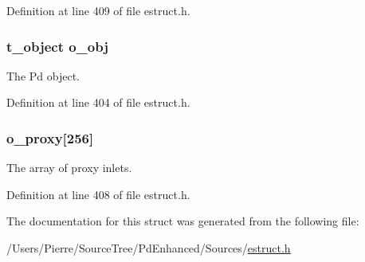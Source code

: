Definition at line 409 of file estruct.\-h.

\hypertarget{struct__eobj_a8cffa8f3338cca7779ab922dab19227c}{
\subsubsection[{o\-\_\-obj}]{\setlength{\rightskip}{0pt plus 5cm}t\-\_\-object o\-\_\-obj}}\label{struct__eobj_a8cffa8f3338cca7779ab922dab19227c}
The Pd object. 

Definition at line 404 of file estruct.\-h.

\hypertarget{struct__eobj_a9435dcf0a1aed105a4c38d24dfc65dbf}{
\subsubsection[{o\-\_\-proxy}]{ o\-\_\-proxy\mbox{[}256\mbox{]}}}\label{struct__eobj_a9435dcf0a1aed105a4c38d24dfc65dbf}
The array of proxy inlets. 

Definition at line 408 of file estruct.\-h.



The documentation for this struct was generated from the following file\-:\begin{DoxyCompactItemize}
\item 
/\-Users/\-Pierre/\-Source\-Tree/\-Pd\-Enhanced/\-Sources/\hyperlink{estruct_8h}{estruct.\-h}\end{DoxyCompactItemize}
